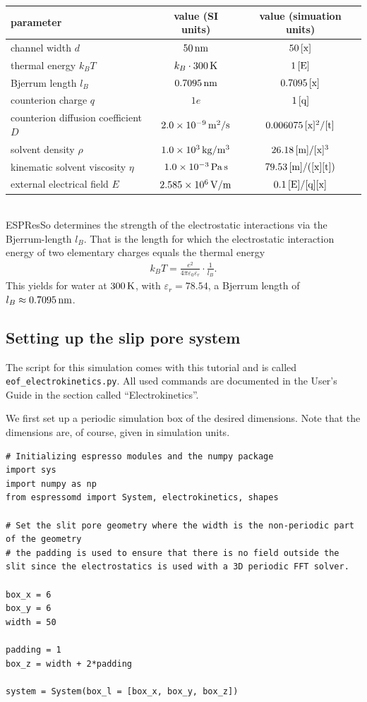 \begin{tabular}[h]{|l|c|c|}
\hline
parameter & value (SI units) & value (simuation units)\\
\hline\hline
channel width $d$ & $50\U{nm}$ & $50\U{[x]}$\\
\hline
thermal energy $k_B T$ & $k_B\cdot300\U K$ & $1\U{[E]}$\\
\hline
Bjerrum length $l_B$ & $0.7095\U{nm}$ & $0.7095\U{[x]}$\\
\hline
counterion charge $q$ & $1e$ & $1\U{[q]}$\\
\hline
counterion diffusion coefficient $D$ & $2.0\E{-9}\U{m^2/s}$ & $0.006075\U{[x]^2/[t]}$\\
\hline
solvent density $\rho$ & $1.0\E{3}\U{kg/m^3}$ & $26.18\U{[m]/[x]^3}$\\
\hline
kinematic solvent viscosity $\eta$ & $1.0\E{-3}\U{Pa}\U{s}$ & $79.53\U{[m]/([x][t])}$\\
\hline
external electrical field $E$ & $2.585\E{6}\U{V/m}$ & $0.1\U{[E]/[q][x]}$\\
\hline
\end{tabular}
\\

ESPResSo determines the strength of the electrostatic interactions via the Bjerrum-length $l_B$. That is the length for which the electrostatic interaction energy of two elementary charges equals the thermal energy
%
\begin{align*}
k_B T=\frac{e^2}{4\pi\varepsilon_0\varepsilon_r}\cdot\frac 1 {l_B}.
\end{align*}
%
This yields for water at $300\U{K}$, with $\varepsilon_r = 78.54$, a Bjerrum length of $l_B\approx0.7095\U{nm}$.


\subsection{Setting up the slip pore system}

The script for this simulation comes with this tutorial and is called \texttt{eof\_electrokinetics.py}. All used commands are documented in the User's Guide in the section called ``Electrokinetics''.

We first set up a periodic simulation box of the desired dimensions. Note that the dimensions are, of course, given in simulation units.

\begin{lstlisting}
# Initializing espresso modules and the numpy package
import sys
import numpy as np
from espressomd import System, electrokinetics, shapes

# Set the slit pore geometry where the width is the non-periodic part of the geometry
# the padding is used to ensure that there is no field outside the slit since the electrostatics is used with a 3D periodic FFT solver.

box_x = 6
box_y = 6
width = 50

padding = 1
box_z = width + 2*padding

system = System(box_l = [box_x, box_y, box_z])
\end{lstlisting}

